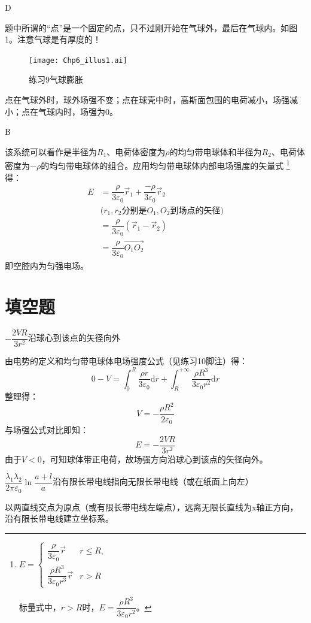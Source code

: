 \documentclass[b5paper,opensource,sourcefont,parskip]{qyxf-book}
\newcommand{\di}[1]{\mathrm{d}#1}
\begin{document}
D

\solve
题中所谓的“点”是一个固定的点，只不过刚开始在气球外，最后在气球内。如图1。注意气球是有厚度的！
\begin{figure}[!htbp]
	\centering
	\texttt{[image: Chp6\_illus1.ai]}
	\caption{练习9\quad 气球膨胀}
\end{figure}
点在气球外时，球外场强不变；点在球壳中时，高斯面包围的电荷减小，场强减小；点在气球内时，场强为0。

B

\solve
该系统可以看作是半径为$R_1$、电荷体密度为$\rho$的均匀带电球体和半径为$R_2$、电荷体密度为$-\rho$的均匀带电球体的组合。应用均匀带电球体内部电场强度的矢量式
\footnote{
	$E=
	\begin{cases}
	\dfrac{\rho}{3\varepsilon_0}\vec{r} & r\leqslant R,\\
	\dfrac{\rho R^3}{3\varepsilon_0 r^3}\vec{r} & r > R
	\end{cases}$

	标量式中，$r>R$时，$E=\dfrac{\rho R^3}{3\varepsilon_0 r^2}$。
}得：
\begin{align*}
	E&=\dfrac{\rho}{3\varepsilon_0}\vec{r}_1+\dfrac{-\rho}{3\varepsilon_0}\vec{r}_2\\
	&\text{($r_1,r_2$分别是$O_1,O_2$到场点的矢径)}\\
	&=\dfrac{\rho}{3\varepsilon_0}(\vec{r}_1-\vec{r}_2)\\
	&=\dfrac{\rho}{3\varepsilon_0}\overrightarrow{O_1O_2}
\end{align*}
即空腔内为匀强电场。

\section{填空题}

$-\dfrac{2VR}{3r^2}$\quad 沿球心到该点的矢径向外

\solve
由电势的定义和均匀带电球体电场强度公式（见练习10脚注）得：
\[
0-V=\int_{0}^{R}\dfrac{\rho r}{3\varepsilon_0}\di{r}+\int_{R}^{+\infty}\dfrac{\rho R^3}{3\varepsilon_0 r^2}\di{r}
\]
整理得：
\[
V=-\dfrac{\rho R^2}{2\varepsilon_0}
\]
与场强公式对比即知：
\[
E=-\dfrac{2VR}{3r^2}
\]
由于$V<0$，可知球体带正电荷，故场强方向沿球心到该点的矢径向外。

$\dfrac{\lambda_1\lambda_2}{2\pi \varepsilon_0}\ln\dfrac{a+l}{a}$\quad 沿有限长带电线指向无限长带电线（或在纸面上向左）

\solve
以两直线交点为原点（或有限长带电线左端点），远离无限长直线为x轴正方向，沿有限长带电线建立坐标系。
\end{document}
